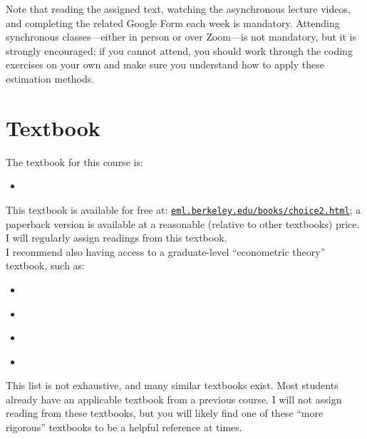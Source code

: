 \documentclass[11pt,letterpaper]{article}
\begin{document}
\noindent Note that reading the assigned text, watching the asynchronous lecture videos, and completing the related Google Form each week is mandatory. Attending synchronous classes---either in person or over Zoom---is not mandatory, but it is strongly encouraged; if you cannot attend, you should work through the coding exercises on your own and make sure you understand how to apply these estimation methods.

\section*{Textbook}

The textbook for this course is:
\begin{itemize}
	\item[] \begin{refsection} \nocite{trainDiscreteChoiceMethods2009} \printbibliography[heading=none] \end{refsection}
\end{itemize}
This textbook is available for free at: \href{https://eml.berkeley.edu/books/choice2.html}{\texttt{eml.berkeley.edu/books/choice2.html}}; a paperback version is available at a reasonable (relative to other textbooks) price. I will regularly assign readings from this textbook. \\

\noindent I recommend also having access to a graduate-level ``econometric theory'' textbook, such as:
\begin{itemize}
	\item[] \begin{refsection} \nocite{cameronMicroeconometricsMethodsApplications2005} \printbibliography[heading=none] \end{refsection}
  \item[] \begin{refsection} \nocite{greeneEconometricAnalysis2018} \printbibliography[heading=none] \end{refsection}
  \item[] \begin{refsection} \nocite{hayashiEconometrics2000} \printbibliography[heading=none] \end{refsection}
	\item[] \begin{refsection} \nocite{wooldridgeEconomtericAnalysisCross2010} \printbibliography[heading=none] \end{refsection}
\end{itemize}
This list is not exhaustive, and many similar textbooks exist. Most students already have an applicable textbook from a previous course. I will not assign reading from these textbooks, but you will likely find one of these ``more rigorous'' textbooks to be a helpful reference at times.
\end{document}
